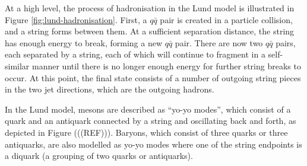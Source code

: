 \documentclass[12pt,a4paper]{report}
\begin{document}
At a high level, the process of hadronisation in the Lund model is illustrated in Figure \ref{fig:lund-hadronisation}. First, a $q\bar{q}$ pair is created in a particle collision, and a string forms between them. At a sufficient separation distance, the string has enough energy to break, forming a new $q\bar{q}$ pair. There are now two $q\bar{q}$ pairs, each separated by a string, each of which will continue to fragment in a self-similar manner until there is no longer enough energy for further string breaks to occur. At this point, the final state consists of a number of outgoing string pieces in the two jet directions, which are the outgoing hadrons.

In the Lund model, mesons are described as ``yo-yo modes'', which consist of a quark and an antiquark connected by a string and oscillating back and forth, as depicted in Figure (((REF))). Baryons, which consist of three quarks or three antiquarks, are also modelled as yo-yo modes where one of the string endpoints is a diquark (a grouping of two quarks or antiquarks).
\end{document}
